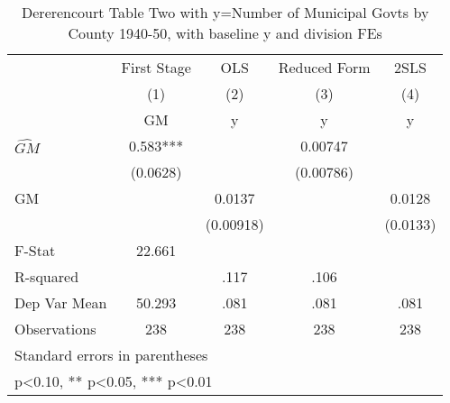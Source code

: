 \begin{table}[htbp]\centering
\def\sym#1{\ifmmode^{#1}\else\(^{#1}\)\fi}
\caption{Dererencourt Table Two with y=Number of Municipal Govts by County 1940-50, with baseline y and division FEs}
\begin{tabular}{l*{4}{c}}
\toprule
                    & First Stage   &         OLS   &Reduced Form   &        2SLS   \\
                    &\multicolumn{1}{c}{(1)}&\multicolumn{1}{c}{(2)}&\multicolumn{1}{c}{(3)}&\multicolumn{1}{c}{(4)}\\
                    &\multicolumn{1}{c}{GM}&\multicolumn{1}{c}{y}&\multicolumn{1}{c}{y}&\multicolumn{1}{c}{y}\\
\midrule
$\hat{GM}$          &       0.583***&               &     0.00747   &               \\
                    &    (0.0628)   &               &   (0.00786)   &               \\
\addlinespace
GM                  &               &      0.0137   &               &      0.0128   \\
                    &               &   (0.00918)   &               &    (0.0133)   \\
\midrule
F-Stat              &      22.661   &               &               &               \\
R-squared           &               &        .117   &        .106   &               \\
Dep Var Mean        &      50.293   &        .081   &        .081   &        .081   \\
Observations        &         238   &         238   &         238   &         238   \\
\bottomrule
\multicolumn{5}{l}{\footnotesize Standard errors in parentheses}\\
\multicolumn{5}{l}{\footnotesize * p<0.10, ** p<0.05, *** p<0.01}\\
\end{tabular}
\end{table}
